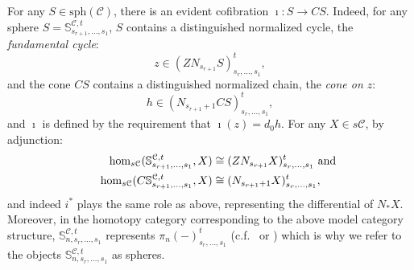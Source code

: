 \documentclass[11pt]{amsart} \renewcommand{\baselinestretch}{1.4}
\theoremstyle{plain}
\theoremstyle{definition}
\newcommand{\DASH}{\mathrm{-}}
\renewcommand{\to}{\longrightarrow}
\newcommand{\calc}{\mathcal{C}}
\newcommand{\spheres}[1]{\mathrm{sph}(#1)}
\newcommand{\citeBOX}[2][]{\cite[\mbox{#1}]{#2}}
\begin{document}
\begin{Pi-algebras and cohomology algebras}
For any $S\in\spheres{\calc}$, there is an evident cofibration $\imath :S\to CS$. Indeed, for any sphere $S=\mathbb{S}^{\calc,t}_{s_{r+1},\ldots,s_1}$, $S$ contains  a distinguished normalized cycle, the \emph{fundamental cycle}:
\[z\in (ZN_{s_{r+1}}S)_{s_r,\ldots,s_1}^t,\]
and the cone $CS$ contains a distinguished normalized chain, the \emph{cone on $z$}:
\[h\in (N_{s_{r+1}+1}CS)_{s_r,\ldots,s_1}^t,\]
and $\imath$ is defined by the requirement that $\imath(z)=d_0h$.
For any $X\in s\calc$, by adjunction:
\begin{alignat*}{2}
\hom_{s\calc}(\mathbb{S}^{\calc,t}_{s_{r+1},\ldots,s_1},X)&\cong (ZN_{s_{r+1}}X)_{s_r,\ldots,s_1}^t\makebox[0cm][l]{ and}\\
\hom_{s\calc}(C\mathbb{S}^{\calc,t}_{s_{r+1},\ldots,s_1},X)&\cong (N_{s_{r+1}+1}X)_{s_r,\ldots,s_1}^t,
\end{alignat*}
and indeed $i^*$ plays the same role as above, representing the differential of $N_*X$. Moreover, in the homotopy category corresponding to the above model category structure, $\mathbb{S}^{\calc,t}_{n,s_r,\ldots,s_1}$ represents $\pi_n(\DASH)^t_{s_r,\ldots,s_1}$ (c.f.\ \citeBOX[\S1]{MR1089001} or \citeBOX[\S3.1.1]{Blanc_Stover-Groth_SS.pdf}) which is why  we  refer to the objects $\mathbb{S}^{\calc,t}_{n,s_r,\ldots,s_1}$ as spheres.


\end{Pi-algebras and cohomology algebras}
\end{document}
